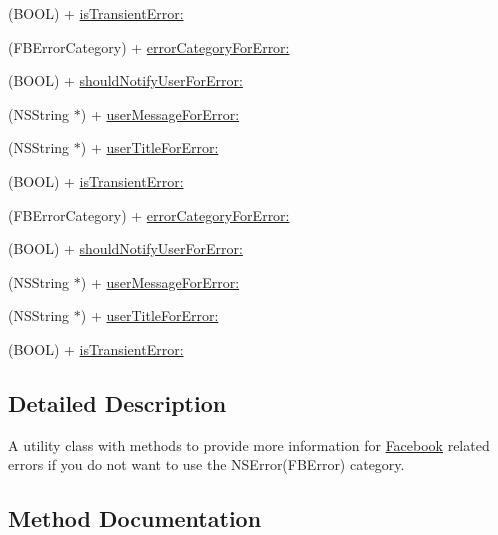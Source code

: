 \begin{DoxyCompactItemize}
\item 
(B\+O\+OL) + \hyperlink{interfaceFBErrorUtility_a0bab53fff61ccb645f5647e1a03287c3}{is\+Transient\+Error\+:}
\item 
(F\+B\+Error\+Category) + \hyperlink{interfaceFBErrorUtility_a708ac3cac2c06d5f9432a45e4ad67082}{error\+Category\+For\+Error\+:}
\item 
(B\+O\+OL) + \hyperlink{interfaceFBErrorUtility_a1417132074a898433aa3a79ab6ebc7b6}{should\+Notify\+User\+For\+Error\+:}
\item 
(N\+S\+String $\ast$) + \hyperlink{interfaceFBErrorUtility_a059cc6fc35dd8fd3a13ee584ca7bb391}{user\+Message\+For\+Error\+:}
\item 
(N\+S\+String $\ast$) + \hyperlink{interfaceFBErrorUtility_a6b294817d5d939cfa12975d994d1dd8b}{user\+Title\+For\+Error\+:}
\item 
(B\+O\+OL) + \hyperlink{interfaceFBErrorUtility_a0bab53fff61ccb645f5647e1a03287c3}{is\+Transient\+Error\+:}
\item 
(F\+B\+Error\+Category) + \hyperlink{interfaceFBErrorUtility_a708ac3cac2c06d5f9432a45e4ad67082}{error\+Category\+For\+Error\+:}
\item 
(B\+O\+OL) + \hyperlink{interfaceFBErrorUtility_a1417132074a898433aa3a79ab6ebc7b6}{should\+Notify\+User\+For\+Error\+:}
\item 
(N\+S\+String $\ast$) + \hyperlink{interfaceFBErrorUtility_a059cc6fc35dd8fd3a13ee584ca7bb391}{user\+Message\+For\+Error\+:}
\item 
(N\+S\+String $\ast$) + \hyperlink{interfaceFBErrorUtility_a6b294817d5d939cfa12975d994d1dd8b}{user\+Title\+For\+Error\+:}
\item 
(B\+O\+OL) + \hyperlink{interfaceFBErrorUtility_a0bab53fff61ccb645f5647e1a03287c3}{is\+Transient\+Error\+:}
\end{DoxyCompactItemize}


\subsection{Detailed Description}
A utility class with methods to provide more information for \hyperlink{interfaceFacebook}{Facebook} related errors if you do not want to use the N\+S\+Error(\+F\+B\+Error) category. 

\subsection{Method Documentation}
\mbox{\label{interfaceFBErrorUtility_a708ac3cac2c06d5f9432a45e4ad67082}} 

